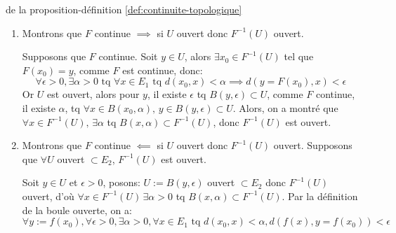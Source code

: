 \begin{preuve} de la proposition-définition \ref{def:continuite-topologique}
   \begin{enumerate}
       \item Montrons que $F$ continue  $\implies$ si $U$ ouvert donc $F^{-1}(U)$ ouvert.
           \par
           Supposons que $F$ continue. Soit  $y \in U$, alors  $\exists x_0 \in F^{-1}(U)$ tel que $F(x_0) = y$, 
           comme  $F$ est continue, donc:  
           \[
               \forall \epsilon > 0, \exists \alpha > 0 \text{ tq } \forall x \in E_1 \text{ tq }  d(x_0, x) < \alpha \implies d(y = F(x_0), x) < \epsilon
           \] 
           Or $U$ est ouvert, alors pour $y$, il existe  $\epsilon$ tq  $B(y, \epsilon) \subset U$, comme $F$ continue, il existe $\alpha$, tq $\forall x \in B(x_0, \alpha), \, y \in B(y, \epsilon) \subset U$. Alors, on a montré que $\forall x \in F^{-1}(U), \, \exists \alpha$ tq $B(x, \alpha) \subset F^{-1}(U)$, donc $F^{-1}(U)$ est ouvert. 
       \item Montrons que $F$ continue  $\impliedby$ si $U$ ouvert donc $F^{-1}(U)$ ouvert.
           Supposons que $\forall U$ ouvert $\subset E_2$, $F^{-1}(U)$ est ouvert. 
           \par
           Soit $y \in U$ et $\epsilon > 0$, posons: $U := B(y, \epsilon)$ ouvert  $\subset E_2$ donc $F^{-1}(U)$ ouvert, d'où $\forall x \in F^{-1}(U) \, \exists \alpha > 0$ tq $B(x, \alpha) \subset F^{-1}(U)$. 
           Par la définition de la boule ouverte, on a:
           \[
               \forall y := f(x_0), \forall \epsilon > 0, \exists \alpha > 0, \forall x \in E_1 \text{ tq } d(x_0, x) < \alpha, d(f(x), y = f(x_0)) < \epsilon
           \] 
   \end{enumerate} 
\end{preuve}
